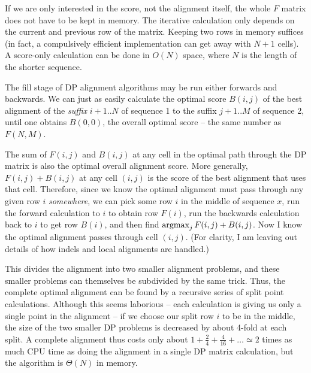 \documentclass[11pt]{article}
\def\argmax{\mathop{\mathrm{argmax}}\limits}
\begin{document}
If we are only interested in the score, not the alignment itself, the
whole $F$ matrix does not have to be kept in memory. The iterative
calculation only depends on the current and previous row of the
matrix. Keeping two rows in memory suffices (in fact, a compulsively
efficient implementation can get away with $N+1$ cells). A score-only
calculation can be done in $O(N)$ space, where $N$ is the length of
the shorter sequence.

The fill stage of DP alignment algorithms may be run either forwards
and backwards. We can just as easily calculate the optimal score
$B(i,j)$ of the best alignment of the \emph{suffix} $i+1..N$ of
sequence 1 to the suffix $j+1..M$ of sequence 2, until one obtains
$B(0,0)$, the overall optimal score -- the same number as $F(N,M)$.

The sum of $F(i,j)$ and $B(i,j)$ at any cell in the optimal path
through the DP matrix is also the optimal overall alignment score.
More generally, $F(i,j) + B(i,j)$ at any cell $(i,j)$ is the score of
the best alignment that uses that cell. Therefore, since we know the
optimal alignment must pass through any given row $i$
\emph{somewhere}, we can pick some row $i$ in the middle of sequence
$x$, run the forward calculation to $i$ to obtain row $F(i)$, run the
backwards calculation back to $i$ to get row $B(i)$, and then find
$\argmax\nolimits_j F(i,j) + B(i,j)$. Now I know the optimal alignment
passes through cell $(i,j)$. (For clarity, I am leaving out details of
how indels and local alignments are handled.)

This divides the alignment into two smaller alignment problems, and
these smaller problems can themselves be subdivided by the same trick.
Thus, the complete optimal alignment can be found by a recursive
series of split point calculations. Although this seems laborious --
each calculation is giving us only a single point in the alignment --
if we choose our split row $i$ to be in the middle, the size of the
two smaller DP problems is decreased by about 4-fold at each split. A
complete alignment thus costs only about $1 + \frac{2}{4} +
\frac{4}{16} + \ldots \simeq 2$ times as much CPU time as doing the
alignment in a single DP matrix calculation, but the algorithm is
$\Theta(N)$ in memory.
\end{document}

